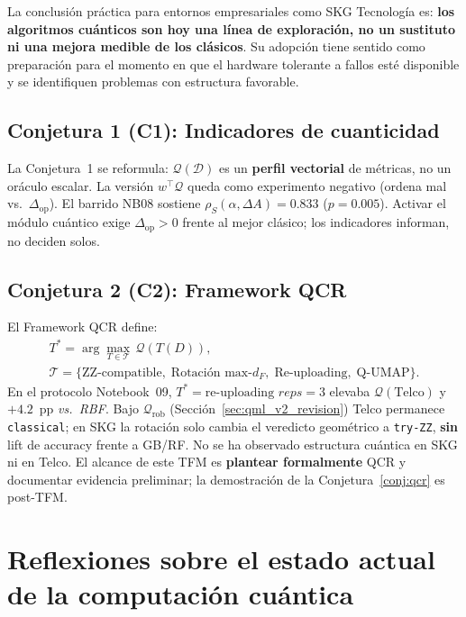 La conclusión práctica para entornos empresariales como SKG Tecnología es: \textbf{los algoritmos cuánticos son hoy una línea de exploración, no un sustituto ni una mejora medible de los clásicos}. Su adopción tiene sentido como preparación para el momento en que el hardware tolerante a fallos esté disponible y se identifiquen problemas con estructura favorable.

\subsection*{Conjetura 1 (C1): Indicadores de cuanticidad}

La Conjetura~1 se reformula: $\mathcal{Q}(\mathcal{D})$ es un \textbf{perfil vectorial} de métricas, no un oráculo escalar. La versión $w^\top\mathcal{Q}$ queda como experimento negativo (ordena mal vs.\ $\Delta_{\mathrm{op}}$). El barrido NB08 sostiene $\rho_S(\alpha,\Delta A)=0.833$ ($p=0.005$). Activar el módulo cuántico exige $\Delta_{\mathrm{op}}>0$ frente al mejor clásico; los indicadores informan, no deciden solos.

\subsection*{Conjetura 2 (C2): Framework QCR}

El Framework QCR define:
\[
\begin{gathered}
T^* = \arg\max_{T \in \mathcal{T}}\, \mathcal{Q}(T(D)),\\
\mathcal{T} = \{\text{ZZ-compatible},\; \text{Rotación max-}d_F,\; \text{Re-uploading},\; \text{Q-UMAP}\}.
\end{gathered}
\]
En el protocolo Notebook~09, $T^* = \text{re-uploading } reps=3$ elevaba $\mathcal{Q}(\text{Telco})$ y $+4.2$~pp \emph{vs.\ RBF}. Bajo $\mathcal{Q}_{\mathrm{rob}}$ (Sección~\ref{sec:qml_v2_revision}) Telco permanece \texttt{classical}; en SKG la rotación solo cambia el veredicto geométrico a \texttt{try-ZZ}, \textbf{sin} lift de accuracy frente a GB/RF. No se ha observado estructura cuántica en SKG ni en Telco. El alcance de este TFM es \textbf{plantear formalmente} QCR y documentar evidencia preliminar; la demostración de la Conjetura~\ref{conj:qcr} es post-TFM.

\section{Reflexiones sobre el estado actual de la computación cuántica}

